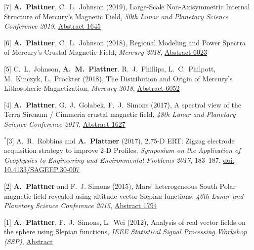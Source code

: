 \documentclass[10pt]{article}
\begin{document}
\spcp
\hspace{-0.5cm}[7] \textbf{A.~Plattner}, C.~L.~Johnson (2019), Large-Scale Non-Axisymmetric Internal Structure of Mercury's Magnetic Field,
\emph{50th Lunar and Planetary Science Conference 2019},
\href{https://www.hou.usra.edu/meetings/lpsc2019/pdf/1645.pdf}{Abstract 1645}


\clearpage
\hspace{-0.5cm}[6] \textbf{A.~Plattner}, C.~L.~Johnson (2018),
Regional Modeling and Power Spectra of Mercury's Crustal Magnetic Field,
\emph{Mercury 2018},
\href{https://www.hou.usra.edu/meetings/mercury2018/pdf/6023.pdf}{Abstract 6023}

\spcp
\hspace{-0.5cm}[5] C.~L.~Johnson,
\textbf{A.~M.~Plattner}. R.~J.~Phillips, L.~C.~Philpott, M.~Kinczyk,
L.~Prockter (2018), The Distribution and Origin of Mercury's Lithospheric Magnetization, \emph{Mercury 2018},
\href{https://www.hou.usra.edu/meetings/mercury2018/pdf/6052.pdf}{Abstract
  6052}

\spcp
\hspace{-0.5cm}[4] \textbf{A.~Plattner}, G.~J.~Golabek, F.~J.~Simons (2017),
A spectral view of the Terra Sirenum / Cimmeria crustal magnetic
field,
\emph{48th Lunar and Planetary Science Conference 2017},
\href{http://www.lpi.usra.edu/meetings/lpsc2017/pdf/1627.pdf}{Abstract 1627}

\spcp
\hspace{-0.67cm}$^*$[3] A.~R.~Robbins and \textbf{A.~Plattner}
(2017),
2.75-D ERT: Zigzag electrode acquisition strategy to improve 2-D
Profiles,
\emph{Symposium on the Application of Geophysics to Engineering and
  Environmental Problems 2017}, 183--187,
\href{http://library.seg.org/doi/pdf/10.4133/SAGEEP.30-007}{doi: 10.4133/SAGEEP.30-007}

\spcp
\hspace{-0.5cm}[2] \textbf{A.~Plattner} and F.~J. Simons (2015),
Mars' heterogeneous South Polar magnetic field revealed using altitude vector Slepian functions,
\emph{46th Lunar and Planetary Science Conference 2015},
\href{http://www.hou.usra.edu/meetings/lpsc2015/pdf/1794.pdf}{Abstract 1794}

\spcp
\hspace{-0.5cm}[1] \textbf{A.~Plattner}, F.~J.~Simons, L.~Wei (2012),
Analysis of real vector fields on the sphere using Slepian functions,
\emph{IEEE Statistical Signal Processing Workshop (SSP)},
\href{http://ieeexplore.ieee.org/stamp/stamp.jsp?tp=&arnumber=6319659}{Abstract}
\end{document}
